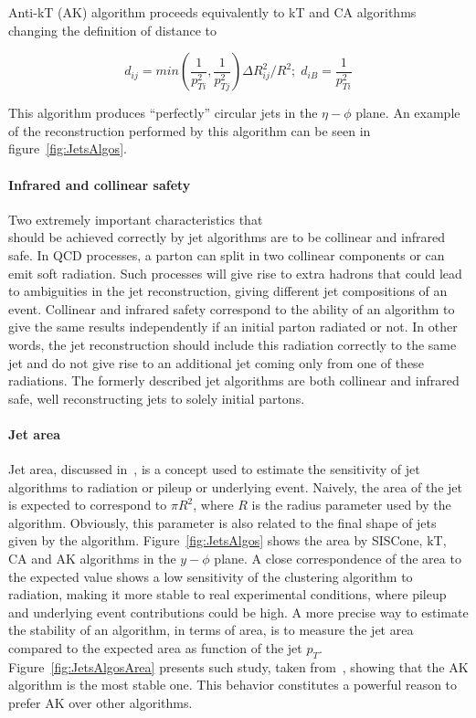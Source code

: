 Anti-kT (AK) algorithm proceeds equivalently to kT and CA algorithms changing the definition of distance to

\begin{equation}
  \label{eq:antikt}
  d_{ij}=min\left(\frac{1}{p_{Ti}^{2}},\frac{1}{p_{Tj}^{2}}\right)\Delta R_{ij}^{2}/R^{2};\; d_{iB}=\frac{1}{p_{Ti}^{2}}
\end{equation} 

This algorithm produces ``perfectly'' circular jets in the $\eta-\phi$ plane. An example of the reconstruction performed by this algorithm can be seen in figure~\ref{fig:JetsAlgos}.

\paragraph{Infrared and collinear safety}

\hfill Two extremely important characteristics that \\should be achieved correctly by jet algorithms are to be collinear and infrared safe. In QCD processes, a parton can split in two collinear components or can emit soft radiation. Such processes will give rise to extra hadrons that could lead to ambiguities in the jet reconstruction, giving different jet compositions of an event. Collinear and infrared safety correspond to the ability of an algorithm to give the same results independently if an initial parton radiated or not. In other words, the jet reconstruction should include this radiation correctly to the same jet and do not give rise to an additional jet coming only from one of these radiations. The formerly described jet algorithms are both collinear and infrared safe, well reconstructing jets to solely initial partons. 

\paragraph{Jet area}

Jet area, discussed in~\cite{Cacciari:2008gn}, is a concept used to estimate the sensitivity of jet algorithms to radiation or pileup or underlying event. Naively, the area of the jet is expected to correspond to $\pi R^{2}$, where $R$ is the radius parameter used by the algorithm. Obviously, this parameter is also related to the final shape of jets given by the algorithm. Figure~\ref{fig:JetsAlgos} shows the area by SISCone, kT, CA and AK algorithms in the $y-\phi$ plane. A close correspondence of the area to the expected value shows a low sensitivity of the clustering algorithm to radiation, making it more stable to real experimental conditions, where pileup and underlying event contributions could be high. A more precise way to estimate the stability of an algorithm, in terms of area, is to measure the jet area compared to the expected area as function of the jet $p_{T}$. Figure~\ref{fig:JetsAlgosArea} presents such study, taken from~\cite{Cacciari:2008gp}, showing that the AK algorithm is the most stable one. This behavior constitutes a powerful reason to prefer AK over other algorithms. 

